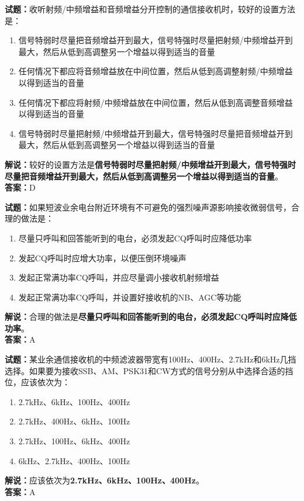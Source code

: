 \documentclass{ctexbook}
\begin{document}
\bigskip


\noindent\textbf{试题：}收听射频/中频增益和音频增益分开控制的通信接收机时，较好的设置方法是：
\begin{enumerate}[leftmargin=3em]
\item 信号特弱时尽量把音频增益开到最大，信号特强时尽量把射频/中频增益开到最大，然后从低到高调整另一个增益以得到适当的音量
\item 任何情况下都应将音频增益放在中间位置，然后从低到高调整射频/中频增益以得到适当的音量
\item 任何情况下都应将射频/中频增益放在中间位置，然后从低到高调整音频增益以得到适当的音量
\item 信号特弱时尽量把射频/中频增益开到最大，信号特强时尽量把音频增益开到最大，然后从低到高调整另一个增益以得到适当的音量
\end{enumerate}
\noindent\textbf{解说：}较好的设置方法是\textbf{信号特弱时尽量把射频/中频增益开到最大，信号特强时尽量把音频增益开到最大，然后从低到高调整另一个增益以得到适当的音量}。\\\noindent\textbf{答案：}D



\bigskip


\noindent\textbf{试题：}如果短波业余电台附近环境有不可避免的强烈噪声源影响接收微弱信号，合理的做法是：
\begin{enumerate}[leftmargin=3em]
\item 尽量只呼叫和回答能听到的电台，必须发起CQ呼叫时应降低功率
\item 发起CQ呼叫时应增大功率，以便压倒环境噪声
\item 发起正常满功率CQ呼叫，并应尽量调小接收机射频增益
\item 发起正常满功率CQ呼叫，并设置好接收机的NB、AGC等功能
\end{enumerate}
\noindent\textbf{解说：}合理的做法是\textbf{尽量只呼叫和回答能听到的电台，必须发起CQ呼叫时应降低功率}。\\\noindent\textbf{答案：}A




\bigskip


\noindent\textbf{试题：}某业余通信接收机的中频滤波器带宽有100Hz、400Hz、2.7kHz和6kHz几挡选择。如果要为接收SSB、AM、PSK31和CW方式的信号分别从中选择合适的挡位，应该依次为：
\begin{enumerate}[leftmargin=3em]
\item 2.7kHz、6kHz、100Hz、400Hz
\item 2.7kHz、400Hz、6kHz、100Hz
\item 2.7kHz、100Hz、6kHz、400Hz
\item 6kHz、2.7kHz、400Hz、100Hz
\end{enumerate}
\noindent\textbf{解说：}应该依次为\textbf{2.7kHz、6kHz、100Hz、400Hz}。\\\noindent\textbf{答案：}A
\end{document}
